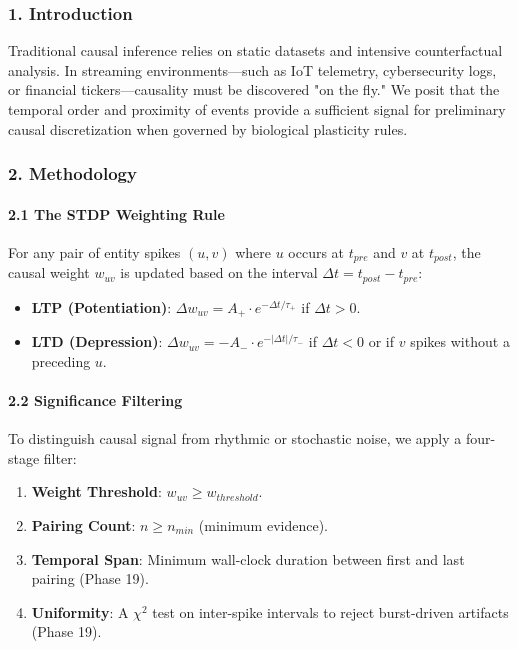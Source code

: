 \documentclass[10pt,journal,compsoc]{IEEEtran}
\begin{document}
\subsubsection{1. Introd\-uction}
Traditional causal inference relies on static datasets and intensive count\-erfactual analysis. In streaming envir\-onments—such as IoT telemetry, cyber\-security logs, or financial tickers—causality must be discovered "on the fly." We posit that the temporal order and proximity of events provide a sufficient signal for preliminary causal discr\-etization when governed by biological plasticity rules.

\subsubsection{2. Methodology}

\paragraph{2.1 The STDP Weighting Rule}
For any pair of entity spikes $(u, v)$ where $u$ occurs at $t_{pre}$ and $v$ at $t_{post}$, the causal weight $w_{uv}$ is updated based on the interval $\Delta t = t_{post} - t_{pre}$:
\begin{itemize}
\item \textbf{LTP (Potent\-iation)}: $\Delta w_{uv} = A_+ \cdot e^{-\Delta t / \tau_+}$ if $\Delta t > 0$.
\item \textbf{LTD (Depression)}: $\Delta w_{uv} = -A_- \cdot e^{-|\Delta t| / \tau_-}$ if $\Delta t < 0$ or if $v$ spikes without a preceding $u$.

\end{itemize}
\paragraph{2.2 Signif\-icance Filtering}
To distinguish causal signal from rhythmic or stochastic noise, we apply a four-stage filter:
\begin{enumerate}
\item \textbf{Weight Threshold}: $w_{uv} \geq w_{threshold}$.
\item \textbf{Pairing Count}: $n \geq n_{min}$ (minimum evidence).
\item \textbf{Temporal Span}: Minimum wall-clock duration between first and last pairing (Phase 19).
\item \textbf{Uniformity}: A $\chi^2$ test on inter-spike intervals to reject burst-driven artifacts (Phase 19).

\end{enumerate}
\end{document}
